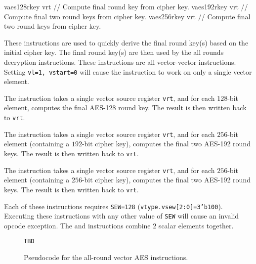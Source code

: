 \begin{cryptoisa}
vaes128rkey vrt    // Compute final round key from cipher key.
vaes192rkey vrt    // Compute final two round keys from cipher key.
vaes256rkey vrt    // Compute final two round keys from cipher key.
\end{cryptoisa}

These instructions are used to quickly derive the final round key(s)
based on the initial cipher key.
The final round key(s) are then used by the all rounds decryption
instructions.
These instructions are all vector-vector instructions.
Setting {\tt vl=1, vstart=0} will cause the instruction to work on only a
single vector element.

The  instruction takes a single
vector source register {\tt vrt}, and for each $128$-bit element, computes
the final AES-128 round key.
The result is then written back to {\tt vrt}.

The  instruction takes a single
vector source register {\tt vrt}, and for each $256$-bit element
(containing a $192$-bit cipher key),
computes the final two AES-192 round keys.
The result is then written back to {\tt vrt}.

The  instruction takes a single
vector source register {\tt vrt}, and for each $256$-bit element
(containing a $256$-bit cipher key),
computes the final two AES-192 round keys.
The result is then written back to {\tt vrt}.

Each of these instructions requires {\tt SEW=128}
({\tt vtype.vsew[2:0]=3'b100}).
Executing these instructions with any other value of {\tt SEW} will cause
an invalid opcode exception.
The  and 
instructions combine $2$ scalar elements together.



\begin{figure}[h]
\begin{lstlisting}[language=pseudo]
TBD
\end{lstlisting}
\caption{Pseudocode for the all-round vector AES instructions.}
\label{fig:pseudo:aes:vector:all-round}
\end{figure}

